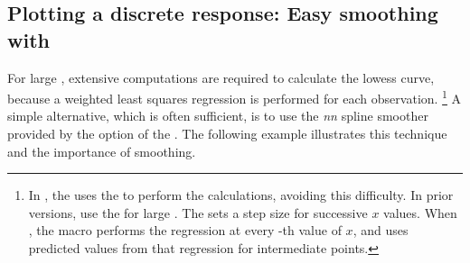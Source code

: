 \subsection{Plotting a discrete response: Easy smoothing with }\label{sec:logist-smooth}

For large \Dsets, extensive computations are required to calculate the lowess curve, because a weighted least squares regression is performed
for each observation.%
\footnote{In , the  uses the 
to perform the calculations, avoiding this difficulty.
In prior versions, use the  for large \Dsets.
The  sets a step size for successive
$x$ values.  When , the macro performs the regression at
every -th value of $x$, and uses predicted values from
    that regression for intermediate points.}
A simple alternative, which is often sufficient, is to use the
\emph{nn} spline smoother provided by the
 option of the .
The following example illustrates this technique and the importance
of smoothing.

